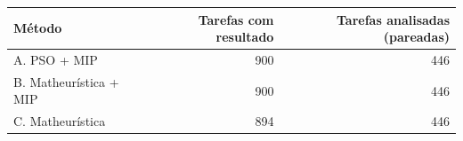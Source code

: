 \begin{tabular}{lrr}
\toprule
Método & Tarefas com resultado & Tarefas analisadas (pareadas) \\
\midrule
A. PSO + MIP & 900 & 446 \\
B. Matheurística + MIP & 900 & 446 \\
C. Matheurística & 894 & 446 \\
\bottomrule
\end{tabular}
